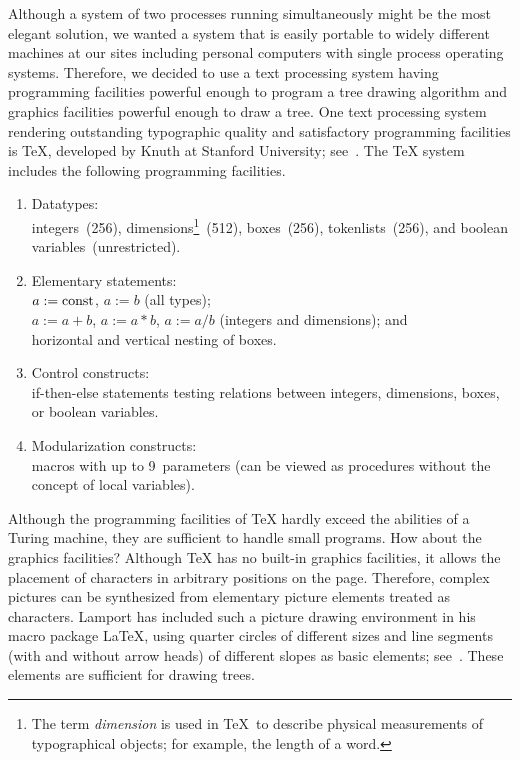 Although a system of two processes running simultaneously might be the most
elegant solution, we wanted a system that is easily portable to
widely different machines at our sites
including personal computers with single process
operating systems.
Therefore, we decided to use a text processing system
having programming facilities powerful enough to 
program a tree drawing algorithm and graphics facilities powerful enough
to draw a tree. One text processing system
rendering outstanding typographic quality and satisfactory programming
facilities is \TeX, developed by Knuth at Stanford University;
see~\cite{TeXbook}.
The \TeX{} system includes the following programming facilities.

\begin{enumerate}
\item[1.] Datatypes:\\
     integers~(256), dimensions\footnote{The term \emph{dimension} is used
     in \TeX\ to describe physical measurements of typographical objects;
     for example, the length of a word.}~(512), 
     boxes~(256), tokenlists~(256), and
     boolean variables~(unrestricted).
\item[2.] Elementary statements:\\
     $a:=\rm const$, $a:=b$ (all types);\\
     $a:=a+b$, $a:=a*b$, $a:=a/b$ (integers and dimensions); and\\
     horizontal and vertical nesting of boxes.
\item[3.] Control constructs:\\
     if-then-else statements testing relations between integers,
     dimensions, boxes, or boolean variables.
\item[4.] Modularization constructs:\\
     macros with up to 9~parameters (can be viewed as procedures without
     the concept of local variables).
\end{enumerate}

Although the programming
facilities of \TeX{} hardly exceed the abilities of a Turing machine,
they are sufficient to
handle small programs. How about the graphics facilities?
Although \TeX{} has no built-in graphics facilities, it
allows the placement of characters in arbitrary positions on
the page. Therefore, complex pictures can be synthesized from elementary
picture elements treated as characters. Lamport has included such
a picture drawing environment in his macro package \LaTeX, using
quarter circles of different sizes and line segments (with and without
arrow heads) of different slopes as basic elements; see~\cite{LaTeX}.
These elements are sufficient for drawing trees.

